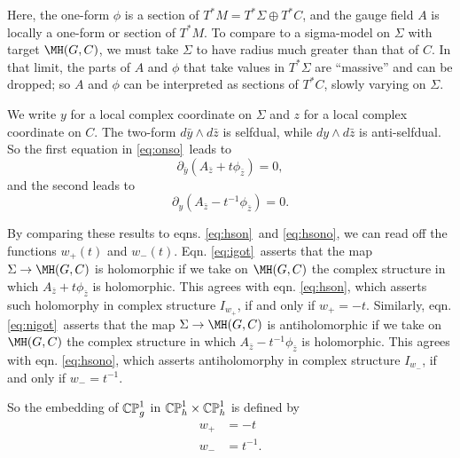 Here, the one-form $\phi$ is a section of $T^*M=T^*\Sigma\oplus
T^*C$, and the gauge field $A$ is locally a one-form or section of
$T^*M$. To compare to a sigma-model on $\Sigma$ with target
$\MH(G,C)$, we must take $\Sigma $ to have radius much greater
than that of $C$.  In that limit, the parts of $A$ and $\phi$ that
take values in $T^*\Sigma$ are ``massive'' and can be dropped; so
$A$ and $\phi$ can be interpreted as sections of $T^*C$, slowly
varying on $\Sigma$.

We write $y$ for a local complex coordinate on $\Sigma$ and $z$
for a local complex coordinate on $C$.  The two-form $d\bar
y\wedge d\bar z$ is selfdual, while $dy\wedge d\bar z$ is
anti-selfdual. So the first equation in \eqref{eq:onso}\ leads to
\setcounter{equation}{8}
\begin{equation}\label{eq:igot}
\partial_{\bar y}\left(A_{\bar z}+t \phi_{\bar
z}\right)=0,
\end{equation}
 and the second leads to
\setcounter{equation}{9}
\begin{equation}\label{eq:nigot}
\partial_y\left(A_{\bar z}-t^{-1}\phi_{\bar
z}\right)=0.
\end{equation}

By comparing these results to eqns. \eqref{eq:hson}\ and \eqref{eq:hsono}, we can read
off the functions $w_+(t)$ and $w_-(t)$.   Eqn. \eqref{eq:igot}\ asserts
that the map $\Sigma\to \MH(G,C)$ is holomorphic if we take on
$\MH(G,C)$  the complex structure in which $A_{\bar z}+t\phi_{\bar
z}$ is holomorphic.  This agrees with eqn. \eqref{eq:hson}, which asserts
such holomorphy in complex structure $I_{w_+}$, if and only if
$w_+=-t$. Similarly, eqn. \eqref{eq:nigot}\ asserts that the map $\Sigma\to
\MH(G,C)$ is antiholomorphic if we take on $\MH(G,C)$ the complex
structure in which $A_{\bar z}-t^{-1} \phi_{\bar z}$ is
holomorphic.  This agrees with eqn. \eqref{eq:hsono}, which asserts
antiholomorphy in complex structure $I_{w_-}$, if and only if
$w_-=t^{-1}$.

So the embedding of $\Bbb{CP}^1_g$ in $\Bbb{CP}_h^1\times
\Bbb{CP}_h^1$ is defined by %
\setcounter{equation}{10}
\begin{equation}\label{eq:tyroy}
\begin{aligned}w_+ & = -t\\
                                              w_- & = t^{-1}.\\\end{aligned}
\end{equation}

